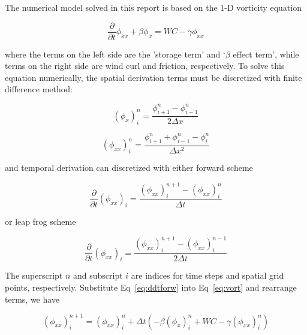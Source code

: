 \documentclass[12pt]{article}
\begin{document}
The numerical model solved in this report is based on the 1-D vorticity equation

\begin{equation}
\frac{\partial}{\partial t}\phi_{xx} + \beta\phi_x = WC - \gamma\phi_{xx}
\label{eq:vort}
\end{equation}
 
where the terms on the left side are the 'storage term' and `$\beta$ effect term', while terms on the right side are wind curl and friction, respectively. To solve this equation numerically, the spatial derivation terms must be discretized with finite difference method:

\begin{equation}
(\phi_x)_i^n = \frac{\phi_{i+1}^n-\phi_{i-1}^n}{2\Delta x}
\label{eq:ddx}
\end{equation}

\begin{equation}
(\phi_{xx})_i^n = \frac{\phi_{i+1}^n+\phi_{i-1}^n-\phi_i^n}{\Delta x^2}
\label{eq:ddxx}
\end{equation}

and temporal derivation can discretized with either forward scheme

\begin{equation}
\frac{\partial}{\partial t}(\phi_{xx})_i = \frac{(\phi_{xx})_i^{n+1}-(\phi_{xx})_i^n}{\Delta t}
\label{eq:ddtforw}
\end{equation}

or leap frog scheme

\begin{equation}
\frac{\partial}{\partial t}(\phi_{xx})_i = \frac{(\phi_{xx})_i^{n+1}-(\phi_{xx})_i^{n-1}}{2\Delta t}
\label{eq:ddtlfrog}
\end{equation}

The superscript $n$ and subscript $i$ are indices for time steps and spatial grid points, respectively. Substitute Eq~\ref{eq:ddtforw} into Eq~\ref{eq:vort} and rearrange terms, we have

\begin{equation}
(\phi_{xx})_i^{n+1} = (\phi_{xx})_i^n + \Delta t(-\beta(\phi_x)_i^n + WC - \gamma(\phi_{xx})_i^n)
\label{eq:vortdes}
\end{equation}

\end{document}
